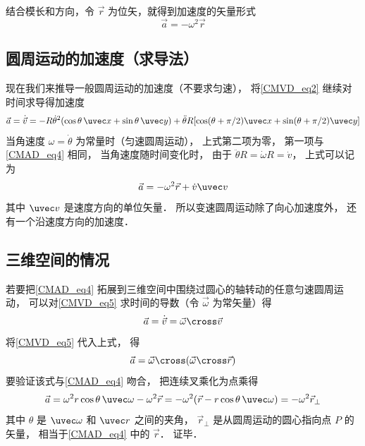 结合模长和方向，令 $\vec r$ 为位矢，就得到加速度的矢量形式
\begin{equation}\label{CMAD_eq4}
\vec a =  - \omega ^2 \vec r
\end{equation}

\subsection{圆周运动的加速度（求导法）}
现在我们来推导一般圆周运动的加速度（不要求匀速），  将\autoref{CMVD_eq2} 继续对时间求导得加速度
\begin{equation}
\vec a = \dot {\vec v} =  - R \dot\theta^2(\cos \theta\, \uvec x + \sin \theta\, \uvec y) + \ddot\theta R [\cos(\theta + \pi/2) \uvec x + \sin(\theta + \pi/2)\uvec y]
\end{equation}
当角速度 $\omega = \dot\theta$ 为常量时（匀速圆周运动）， 上式第二项为零， 第一项与\autoref{CMAD_eq4} 相同， 当角速度随时间变化时， 由于 $\ddot\theta R = \dot\omega R = \dot v$， 上式可以记为
\begin{equation}\label{CMAD_eq6}
\vec a = - \omega ^2 \vec r + \dot v \uvec v
\end{equation}
其中 $\uvec v$ 是速度方向的单位矢量． 所以变速圆周运动除了向心加速度外， 还有一个沿速度方向的加速度．

\subsection{三维空间的情况}

若要把\autoref{CMAD_eq4} 拓展到三维空间中围绕过圆心的轴转动的任意匀速圆周运动， 可以对\autoref{CMVD_eq5} 求时间的导数（令 $\vec\omega$ 为常矢量）得
\begin{equation}\label{CMAD_eq7}
\vec a = \dot{\vec v} = \vec\omega \cross \vec v
\end{equation}
将\autoref{CMVD_eq5} 代入上式， 得
\begin{equation}\label{CMAD_eq9}
\vec a =  \vec\omega \cross (\vec\omega \cross \vec r)
\end{equation}
要验证该式与\autoref{CMAD_eq4} 吻合， 把连续叉乘化为点乘得
\begin{equation}
\vec a = \omega^2 r \cos\theta\, \uvec \omega - \omega^2 \vec r = -\omega^2 (\vec r - r\cos\theta\, \uvec\omega) = -\omega^2 \vec r_\bot
\end{equation}
其中 $\theta$ 是 $\uvec\omega$ 和 $\uvec r$ 之间的夹角， $\vec r_\bot$ 是从圆周运动的圆心指向点 $P$ 的矢量， 相当于\autoref{CMAD_eq4} 中的 $\vec r$． 证毕．

